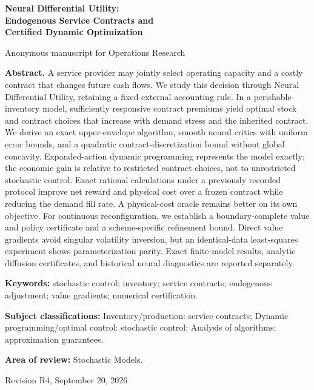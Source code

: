 \documentclass[11pt,letterpaper]{article}
\theoremstyle{definition}
\newcommand{\1}{\mathbf 1}
\begin{document}
\begin{titlepage}
\centering
{\Large\bfseries Neural Differential Utility:\\ Endogenous Service Contracts and\\ Certified Dynamic Optimization\par}
\vspace{0.35in}
{Anonymous manuscript for Operations Research\par}
\vspace{0.25in}
\begin{minipage}{\textwidth}
\textbf{Abstract.}
A service provider may jointly select operating capacity and a costly contract that changes future cash flows. We study this decision through Neural Differential Utility, retaining a fixed external accounting rule. In a perishable-inventory model, sufficiently responsive contract premiums yield optimal stock and contract choices that increase with demand stress and the inherited contract. We derive an exact upper-envelope algorithm, smooth neural critics with uniform error bounds, and a quadratic contract-discretization bound without global concavity. Expanded-action dynamic programming represents the model exactly; the economic gain is relative to restricted contract choices, not to unrestricted stochastic control. Exact rational calculations under a previously recorded protocol improve net reward and physical cost over a frozen contract while reducing the demand fill rate. A physical-cost oracle remains better on its own objective. For continuous reconfiguration, we establish a boundary-complete value and policy certificate and a scheme-specific refinement bound. Direct value gradients avoid singular volatility inversion, but an identical-data least-squares experiment shows parameterization parity. Exact finite-model results, analytic diffusion certificates, and historical neural diagnostics are reported separately.
\par\vspace{0.2in}
\textbf{Keywords:} stochastic control; inventory; service contracts; endogenous adjustment; value gradients; numerical certification.
\par\vspace{0.12in}
\textbf{Subject classifications:} Inventory/production: service contracts; Dynamic programming/optimal control: stochastic control; Analysis of algorithms: approximation guarantees.
\par\vspace{0.12in}
\textbf{Area of review:} Stochastic Models.
\end{minipage}
\vfill
{Revision R4, September 20, 2026\par}
\end{titlepage}
\end{document}
